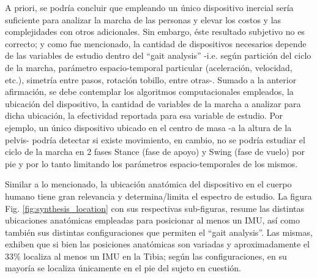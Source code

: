 \noindent A priori, se podría concluir que empleando un único dispositivo inercial sería suficiente para analizar la marcha de las personas y elevar los costos y las complejidades con otros adicionales. Sin embargo, éste resultado subjetivo no es correcto; y como fue mencionado, la cantidad de dispositivos necesarios depende de las variables de estudio dentro del ``gait analysis'' -i.e. según partición del ciclo de la marcha, parámetro espacio-temporal particular (aceleración, velocidad, etc.), simetría entre pasos, rotación tobillo, entre otras-. Sumado a la anterior afirmación, se debe contemplar los algoritmos computacionales empleados, la ubicación del dispositivo, la cantidad de variables de la marcha a analizar para dicha ubicación, la efectividad reportada para esa variable de estudio. Por ejemplo, un único dispositivo ubicado en el centro de masa -a la altura de la pelvis- podría detectar si existe movimiento, en cambio, no se podría estudiar el ciclo de la marcha en 2 fases Stance (fase de apoyo) y Swing (fase de vuelo) por pie y por lo tanto limitando los parámetros espacio-temporales de los mismos.

Similar a lo mencionado, la ubicación anatómica del dispositivo en el cuerpo humano tiene gran relevancia y determina/limita el espectro de estudio. La figura Fig. \ref{fig:synthesis_location} con sus respectivas sub-figuras, resume las distintas ubicaciones anatómicas empleadas para posicionar al menos un IMU, así como también sus distintas configuraciones que permiten el ``gait analysis''. Las mismas, exhiben que si bien las posiciones anatómicas son variadas y aproximadamente el 33\% localiza al menos un IMU en la Tibia; según las configuraciones, en su mayoría se localiza únicamente en el pie del sujeto en cuestión.

